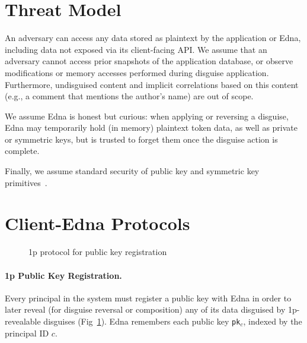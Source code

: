 \section{Threat Model}
An adversary can access any data stored as plaintext by the application or Edna, including data not exposed via its
client-facing API. We assume that an adversary cannot access prior snapshots of the application database, or observe modifications or memory accesses performed during disguise application. Furthermore, undisguised content and implicit correlations based on this content (e.g., a comment that mentions the author’s name) are out of scope.

We assume Edna is honest but curious: when applying or reversing a disguise, Edna may temporarily
hold (in memory) plaintext token data, as well as private or symmetric keys, but is trusted to
forget them once the disguise action is complete.  

Finally, we assume standard security of public key and
symmetric key primitives~.

\section{Client-Edna Protocols}

\begin{figure}[h!]
\caption{1p protocol for public key registration}
\label{fig:acctreg}
\end{figure}

\paragraph{1p Public Key Registration.}
Every principal in the system must register a public key with Edna in order to later reveal (for
disguise reversal or composition) any of its data disguised by 1p-revealable disguises
(Fig~\ref{fig:acctreg}). Edna remembers each public key \texttt{pk}$_c$, indexed by the 
principal ID $c$.

